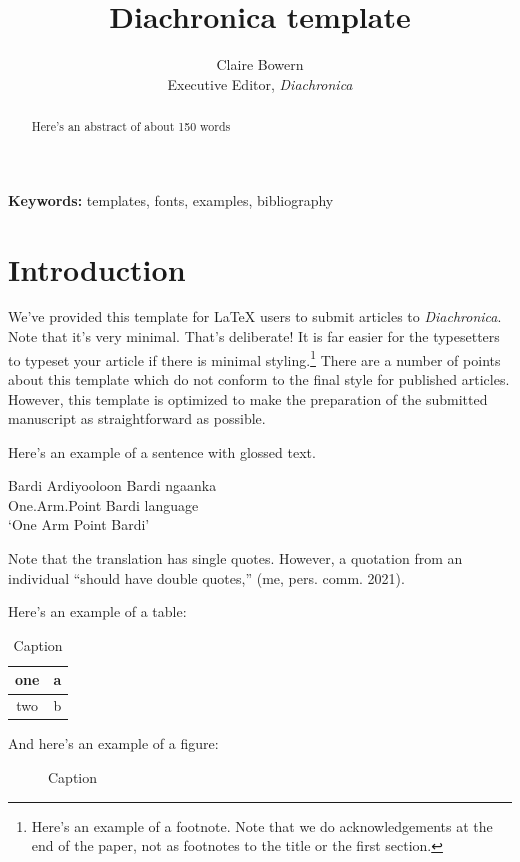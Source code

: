 \documentclass[12pt,letterpaper]{article}
\title{Diachronica template}
\author{Claire Bowern \\ Executive Editor, \textit{Diachronica}}
\begin{document}
\maketitle

\begin{abstract}
    Here's an abstract of about 150 words
\end{abstract}

\noindent\textbf{Keywords:} templates, fonts, examples, bibliography

\section{Introduction}
We've provided this template for \LaTeX{} users to submit articles to \textit{Diachronica}. Note that it's very minimal. That's deliberate! It is far easier for the typesetters to typeset your article if there is minimal styling.\footnote{Here's an example of a footnote. Note that we do acknowledgements at the end of the paper, not as footnotes to the title or the first section.} There are a number of points about this template which do not conform to the final style for published articles. However, this template is optimized to make the preparation of the submitted manuscript as straightforward as possible.

Here's an example of a sentence with glossed text.

\begin{exe}
\ex Bardi \hfill\citep[123]{bow12}
\gll Ardiyooloon Bardi ngaanka\\
One.Arm.Point Bardi language\\
\glt `One Arm Point Bardi'
\end{exe}

Note that the translation has single quotes. However, a quotation from an individual ``should have double quotes,'' (me, pers. comm. 2021).

Here's an example of a table:
\begin{table}[ht]
    \centering
    \caption{Caption} %
    \label{tab:my_label}    \begin{tabular}{cc}
      one   & a \\ \hline
    two     & b
    \end{tabular}
\end{table}

And here's an example of a figure:

\begin{figure}[ht]
    \centering
    \caption{Caption} %
    \label{fig:my_label}
\end{figure}
\end{document}
